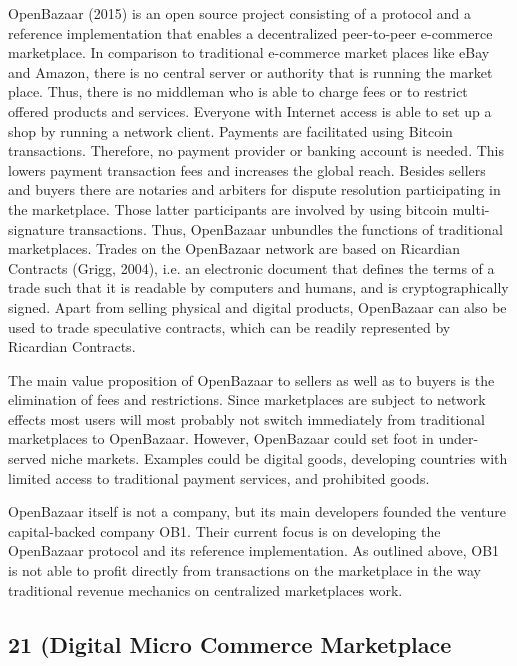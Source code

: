 OpenBazaar (2015) is an open source project consisting of a protocol and a reference 
implementation that enables a decentralized peer-to-peer e-commerce marketplace. 
In comparison to traditional e-commerce market places like eBay and Amazon, there 
is no central server or authority that is running the market place. Thus, there 
is no middleman who is able to charge fees or to restrict offered products and 
services. Everyone with Internet access is able to set up a shop by running a network 
client. Payments are facilitated using Bitcoin transactions. Therefore, no payment 
provider or banking account is needed. This lowers payment transaction fees and 
increases the global reach. Besides sellers and buyers there are notaries and arbiters 
for dispute resolution participating in the marketplace. Those latter participants 
are involved by using bitcoin multi-signature transactions. Thus, OpenBazaar unbundles 
the functions of traditional marketplaces. Trades on the OpenBazaar network are 
based on Ricardian Contracts (Grigg, 2004), i.e. an electronic document that defines 
the terms of a trade such that it is readable by computers and humans, and is cryptographically 
signed. Apart from selling physical and digital products, OpenBazaar can also be 
used to trade speculative contracts, which can be readily represented by Ricardian 
Contracts. 

The main value proposition of OpenBazaar to sellers as well as to buyers is the 
elimination of fees and restrictions. Since marketplaces are subject to network 
effects most users will most probably not switch immediately from traditional marketplaces 
to OpenBazaar. However, OpenBazaar could set foot in under-served niche markets. 
Examples could be digital goods, developing countries with limited access to traditional 
payment services, and prohibited goods. 

OpenBazaar itself is not a company, but its main developers founded the venture 
capital-backed company OB1. Their current focus is on developing the OpenBazaar 
protocol and its reference implementation. As outlined above, OB1 is not able to 
profit directly from transactions on the marketplace in the way traditional revenue 
mechanics on centralized marketplaces work. 

\subsection{21 (Digital Micro Commerce Marketplace}
\label{sec:eco21}

